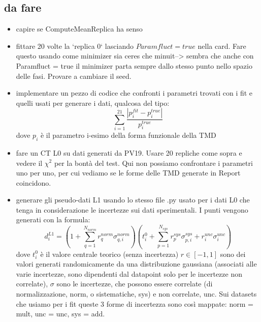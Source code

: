 \documentclass{article}
\begin{document}
\subsection{da fare}
\begin{itemize}
    \item capire se ComputeMeanReplica ha senso
    \item fittare 20 volte la `replica 0` lasciando $Paramfluct = true$ nella card. Fare questo usando come minimizer sia ceres che minuit--> sembra che anche con Paramfluct = true il minimizer parta sempre dallo stesso punto nello spazio delle fasi. Provare a cambiare il seed.
    
    \item implementare un pezzo di codice che confronti i parametri trovati con i fit e quelli usati per generare i dati, qualcosa del tipo:
    \[ \sum_{i=1}^{21} \frac{|p_{i}^{fit} - p_{i}^{true}|}{p_i^{true}} \]
    dove $p_i$ è il parametro i-esimo della forma funzionale della TMD
    \item fare un CT L0 su dati generati da PV19. Usare 20 repliche come sopra e vedere il $\chi^2$ per la bontà del test. Qui non possiamo confrontare i parametri uno per uno, per cui vediamo se le forme delle TMD generate in Report coincidono.
    \item generare gli pseudo-dati L1 usando lo stesso file .py usato per i dati L0 che tenga in considerazione le incertezze sui dati sperimentali. I punti vengono generati con la formula:
    \[ d_i^{L1} = (1+\sum_{q=1}^{N_{norm}} r_q^{norm}\sigma_{q,i}^{norm})(t_i^0 + \sum_{p=1}^{N_{sys}} r_p^{sys}\sigma_{p,i}^{sys} + r_i^{unc} \sigma_i^{unc} )\]
    dove $t_i^0$ è il valore centrale teorico (senza incertezza) $r \in [-1,1]$ sono dei valori generati randomicamente da una distribuzione gaussiana (associati alle varie incertezze, sono dipendenti dal datapoint solo per le incertezze non correlate), $\sigma$ sono le incertezze, che possono essere correlate (di normalizzazione, norm, o sistematiche, sys) e non correlate, unc.
    Sui datasets che usiamo per i fit queste 3 forme di incertezza sono così mappate: norm = mult, unc = unc, sys = add.
\end{itemize}
\end{document}

